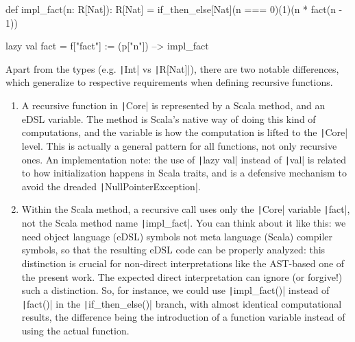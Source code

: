 \documentclass[11pt]{article}
\newcommand{\ScalaI}[1]{\texttt|#1|}
\begin{document}
\begin{ScalaBlockSimple}
  def impl_fact(n: R[Nat]): R[Nat] =
    if_then_else[Nat](n === 0)(1)(n * fact(n - 1))

  lazy val fact = f["fact"] := (p["n"]) --> impl_fact
\end{ScalaBlockSimple}

\noindent Apart from the types (e.g. \ScalaI{Int} vs \ScalaI{R[Nat]}), there 
are two notable differences, which generalize to respective requirements when 
defining recursive functions.

\begin{enumerate}
  \item A recursive function in \ScalaI{Core} is represented by a Scala 
  method, and an eDSL variable. The method is Scala's native way of doing 
  this kind of computations, and the variable is how the computation is 
  lifted to the \ScalaI{Core} level. This is actually a general pattern for 
  all functions, not only recursive ones. An implementation note: the use of 
  \ScalaI{lazy val} instead of \ScalaI{val} is related to how initialization 
  happens in Scala traits, and is a defensive mechanism to avoid the dreaded 
  \ScalaI{NullPointerException}.
  
  \item Within the Scala method, a recursive call uses only the \ScalaI{Core} 
  variable \ScalaI{fact}, not the Scala method name \ScalaI{impl_fact}. You 
  can think about it like this: we need object language (eDSL) symbols not 
  meta language (Scala) compiler symbols, so that the resulting eDSL code can 
  be properly analyzed: this distinction is crucial for non-direct 
  interpretations like the AST-based one of the present work. The expected 
  direct interpretation can ignore (or forgive!) such a distinction. So, for 
  instance, we could use \ScalaI{impl_fact()} instead of \ScalaI{fact()} in 
  the \ScalaI{if_then_else()} branch, with almost identical computational 
  results, the difference being the introduction of a function variable 
  instead of using the actual function.
\end{enumerate}

\end{document}
